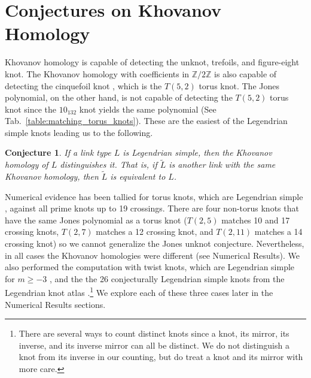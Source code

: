 \documentclass{article}
\theoremstyle{plain}
\newtheorem{conjecture}{Conjecture}
\begin{document}
    \section{Conjectures on Khovanov Homology}
        Khovanov homology is capable of detecting the
        unknot, trefoils, and figure-eight knot. The Khovanov homology with
        coefficients in $\mathbb{Z}/2\mathbb{Z}$ is also capable of detecting
        the cinquefoil knot \cite{BaldwinYingSivekCinquefoilKhovanov},
        which is the $T(5,2)$ torus knot. The Jones
        polynomial, on the other hand, is not capable of detecting the
        $T(5,2)$ torus knot since the $10_{132}$ knot yields the same
        polynomial (See Tab.~\ref{table:matching_torus_knots}).
        These are the easiest of the Legendrian simple knots
        leading us to the following.
        \begin{conjecture}
            If a link type $L$ is Legendrian simple, then the Khovanov homology
            of $L$ distinguishes it. That is, if $\tilde{L}$
            is another link with the same Khovanov homology, then $\tilde{L}$ is
            equivalent to $L$.
        \end{conjecture}
        Numerical evidence has been tallied for torus knots, which are
        Legendrian simple \cite{EtnyreHondaContactTopologyI},
        against all prime knots up to 19 crossings. There are four
        non-torus knots that have the same Jones polynomial as a torus knot
        ($T(2,5)$ matches 10 and 17 crossing knots, $T(2,7)$
        matches a 12 crossing knot, and $T(2,11)$ matches a 14 crossing knot)
        so we cannot generalize the Jones unknot conjecture. Nevertheless, in
        all cases the Khovanov homologies were different
        (see Numerical Results). We also performed the computation
        with twist knots, which are Legendrian simple for $m\geq{-3}$
        \cite{EtnyreEtAlLegendrianAndTransverseTwistKnots}, and the
        the 26 conjecturally Legendrian simple knots from the Legendrian
        knot atlas \cite{LegendrianKnotAtlas}.\footnote{%
            There are several ways to count distinct knots since a knot,
            its mirror, its inverse, and its inverse mirror can all be distinct.
            We do not distinguish a knot from its inverse in our counting,
            but do treat a knot and its mirror with more care.
        }
        We explore each of these three cases later in the Numerical Results
        sections.
        \par\hfill\par
\end{document}
